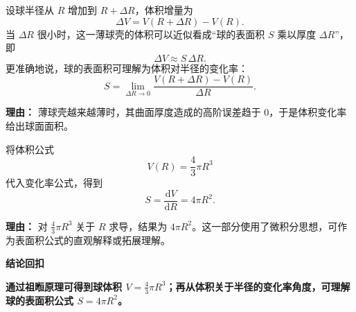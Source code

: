 \begin{proofbox}
\begin{description}[style=nextline, leftmargin=2.8em, labelsep=0.5em, itemsep=0.55em]
\item[\textbf{步骤五（表面积公式的变化率理解）：}] 设球半径从 $R$ 增加到 $R+\Delta R$，体积增量为
\[
\Delta V=V(R+\Delta R)-V(R).
\]
当 $\Delta R$ 很小时，这一薄球壳的体积可以近似看成“球的表面积 $S$ 乘以厚度 $\Delta R$”，即
\[
\Delta V \approx S\,\Delta R.
\]
更准确地说，球的表面积可理解为体积对半径的变化率：
\[
S=\lim_{\Delta R\to 0}\frac{V(R+\Delta R)-V(R)}{\Delta R}.
\]
\par\textbf{理由：} 薄球壳越来越薄时，其曲面厚度造成的高阶误差趋于 $0$，于是体积变化率给出球面面积。

\item[\textbf{步骤六（由体积公式推出表面积）：}] 将体积公式
\[
V(R)=\frac{4}{3}\pi R^{3}
\]
代入变化率公式，得到
\[
S=\frac{\mathrm{d}V}{\mathrm{d}R}=4\pi R^{2}.
\]
\par\textbf{理由：} 对 $\frac{4}{3}\pi R^{3}$ 关于 $R$ 求导，结果为 $4\pi R^{2}$。这一部分使用了微积分思想，可作为表面积公式的直观解释或拓展理解。
\end{description}

\medskip
\textbf{\textcolor{CProof}{结论回扣}}

\textbf{通过祖暅原理可得到球体积 $V=\frac{4}{3}\pi R^{3}$；再从体积关于半径的变化率角度，可理解球的表面积公式 $S=4\pi R^{2}$。}
\end{proofbox}
